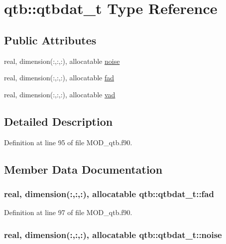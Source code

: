 \hypertarget{structqtb_1_1qtbdat__t}{\section{qtb\-:\-:qtbdat\-\_\-t Type Reference}
\label{structqtb_1_1qtbdat__t}
}
\subsection*{Public Attributes}
\begin{DoxyCompactItemize}
\item 
real, dimension(\-:,\-:,\-:), allocatable \hyperlink{structqtb_1_1qtbdat__t_adef70346a33358ddc755d893b93bf782}{noise}
\item 
real, dimension(\-:,\-:,\-:), allocatable \hyperlink{structqtb_1_1qtbdat__t_a01f5a9db3e7fe07637ea602525bb9981}{fad}
\item 
real, dimension(\-:,\-:,\-:), allocatable \hyperlink{structqtb_1_1qtbdat__t_a200f1e2ce88d50e34844f23530956eff}{vad}
\end{DoxyCompactItemize}


\subsection{Detailed Description}


Definition at line 95 of file M\-O\-D\-\_\-qtb.\-f90.



\subsection{Member Data Documentation}
\hypertarget{structqtb_1_1qtbdat__t_a01f5a9db3e7fe07637ea602525bb9981}{
\subsubsection[{fad}]{\setlength{\rightskip}{0pt plus 5cm}real, dimension(\-:,\-:,\-:), allocatable qtb\-::qtbdat\-\_\-t\-::fad}}\label{structqtb_1_1qtbdat__t_a01f5a9db3e7fe07637ea602525bb9981}


Definition at line 97 of file M\-O\-D\-\_\-qtb.\-f90.

\hypertarget{structqtb_1_1qtbdat__t_adef70346a33358ddc755d893b93bf782}{
\subsubsection[{noise}]{\setlength{\rightskip}{0pt plus 5cm}real, dimension(\-:,\-:,\-:), allocatable qtb\-::qtbdat\-\_\-t\-::noise}}\label{structqtb_1_1qtbdat__t_adef70346a33358ddc755d893b93bf782}


